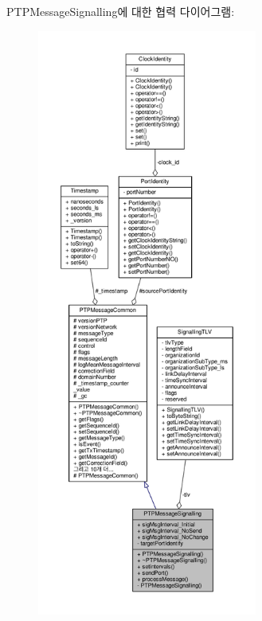 P\+T\+P\+Message\+Signalling에 대한 협력 다이어그램\+:
\nopagebreak
\begin{figure}[H]
\begin{center}
\leavevmode
\includegraphics[height=550pt]{class_p_t_p_message_signalling__coll__graph}
\end{center}
\end{figure}
